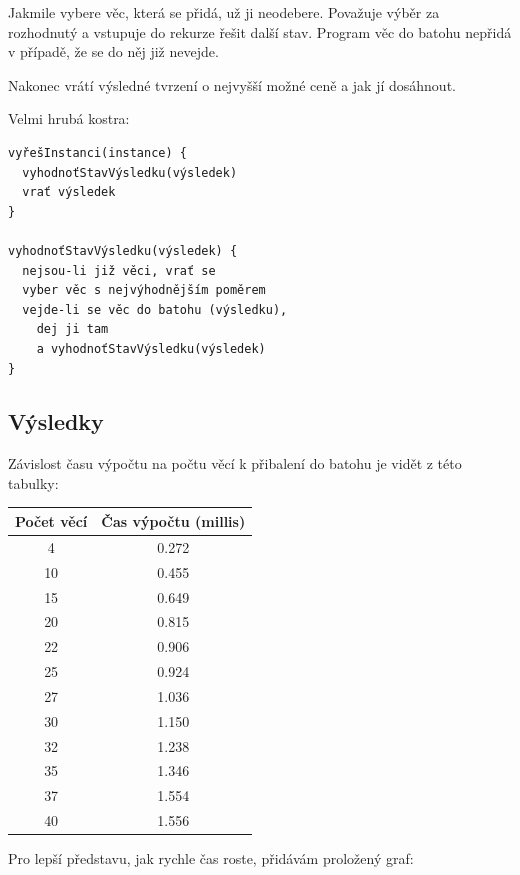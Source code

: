 \documentclass[12pt,a4paper]{article}
\begin{document}
Jakmile vybere věc, která se přidá, už ji neodebere. Považuje výběr za rozhodnutý a vstupuje 
do rekurze řešit další stav. Program věc do batohu
nepřidá v případě, že se do něj již nevejde.

Nakonec
vrátí výsledné tvrzení o nejvyšší možné ceně a jak jí dosáhnout.

Velmi hrubá kostra:

\begin{verbatim}
vyřešInstanci(instance) {
  vyhodnoťStavVýsledku(výsledek)
  vrať výsledek
}

vyhodnoťStavVýsledku(výsledek) {
  nejsou-li již věci, vrať se
  vyber věc s nejvýhodnějším poměrem
  vejde-li se věc do batohu (výsledku),
    dej ji tam 
    a vyhodnoťStavVýsledku(výsledek)
}
\end{verbatim}

\subsection{Výsledky}

Závislost času výpočtu na počtu věcí k přibalení do batohu je vidět z této tabulky:

\begin{center}
\begin{tabular}{|c|c|}
\hline
Počet věcí & Čas výpočtu (millis) \\
\hline\hline
4 & 0.272 \\
\hline
10 & 0.455 \\
\hline
15 & 0.649 \\
\hline
20 & 0.815 \\
\hline
22 & 0.906 \\
\hline
25 & 0.924 \\
\hline
27 & 1.036 \\
\hline
30 & 1.150 \\
\hline
32 & 1.238 \\
\hline
35 & 1.346 \\
\hline
37 & 1.554 \\
\hline
40 & 1.556 \\
\hline
\end{tabular}
\end{center}

Pro lepší představu, jak rychle čas roste, přidávám proložený graf:
\end{document}
